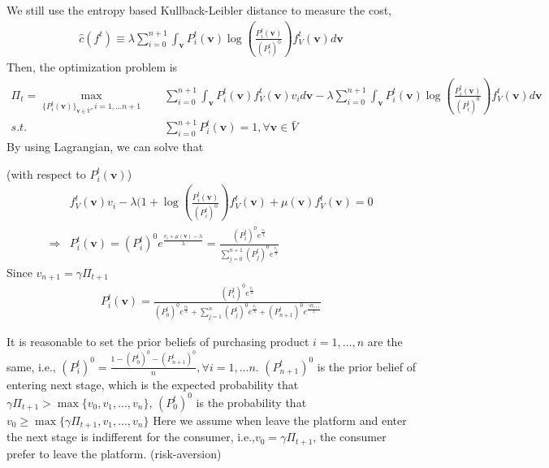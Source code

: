 \documentclass[11pt,a4paper]{article}
\begin{document}
We still use the entropy based Kullback-Leibler distance to measure the cost,
\begin{equation}
    \begin{aligned}
        \hat{c}(f^t)\equiv \lambda\sum_{i=0}^{n+1}\int_\mathbf{v}P^t_{i}(\mathbf{v})\log\left(\frac{P^t_{i}(\mathbf{v})}{(P^t_{i})^0}\right)f^t_V(\mathbf{v})d\mathbf{v}
    \end{aligned}
    \nonumber
\end{equation}
Then, the optimization problem is
\begin{equation}
    \begin{aligned}
        \Pi_t=\max_{\{P^t_i(\mathbf{v})\}_{\mathbf{v}\in \bar{V}},i=1,...n+1}\quad &\sum_{i=0}^{n+1}\int_\mathbf{v} P^t_i(\mathbf{v})f^t_V(\mathbf{v}) v_i d\mathbf{v}-\lambda\sum_{i=0}^{n+1}\int_\mathbf{v}P^t_{i}(\mathbf{v})\log\left(\frac{P^t_{i}(\mathbf{v})}{(P^t_{i})^0}\right)f^t_V(\mathbf{v})d\mathbf{v}\\
        s.t.\quad &\sum_{i=0}^{n+1}P^t_i(\mathbf{v})=1,\forall \mathbf{v}\in \bar{V}
    \end{aligned}
    \nonumber
\end{equation}
By using Lagrangian, we can solve that

(with respect to $P_i^t(\textbf{v})$)
\begin{equation}
    \begin{aligned}
        &f^t_V(\mathbf{v})v_i-\lambda(1+\log\left(\frac{P^t_i(\mathbf{v})}{(P^t_i)^0}\right)f^t_V(\mathbf{v})+\mu(\mathbf{v})f^t_V(\mathbf{v})=0\\
        \Rightarrow &P^t_i(\mathbf{v})=(P_i^t)^0e^{\frac{v_i+\mu(\mathbf{v})-\lambda}{\lambda}}=\frac{(P_i^t)^0e^{\frac{v_i}{\lambda}}}{\sum_{j=0}^{n+1}(P_j^t)^0e^{\frac{v_j}{\lambda}}}
    \end{aligned}
    \nonumber
\end{equation}
Since $v_{n+1}=\gamma\Pi_{t+1}$
\begin{equation}
    \begin{aligned}
        P^t_i(\mathbf{v})=\frac{(P_i^t)^0e^{\frac{v_i}{\lambda}}}{(P_0^t)^0e^{\frac{v_0}{\lambda}}+\sum_{j=1}^{n}(P_j^t)^0e^{\frac{v_j}{\lambda}}+(P_{n+1}^t)^0e^{\frac{\gamma\Pi_{t+1}}{\lambda}}}
    \end{aligned}
    \nonumber
\end{equation}

It is reasonable to set the prior beliefs of purchasing product $i=1,...,n$ are the same, i.e., $(P_i^t)^0=\frac{1-(P_0^t)^0-(P_{n+1}^t)^0}{n},\forall i=1,...n$. $(P_{n+1}^t)^0$ is the prior belief of entering next stage, which is the expected probability that $\gamma\Pi_{t+1}>\max\{v_0,v_1,...,v_n\}$, $(P_0^t)^0$ is the probability that $v_0\geq \max\{\gamma\Pi_{t+1},v_1,...,v_n\}$ Here we assume when leave the platform and enter the next stage is indifferent for the consumer, i.e.,$v_0=\gamma\Pi_{t+1}$, the consumer prefer to leave the platform. (risk-aversion)
\end{document}
